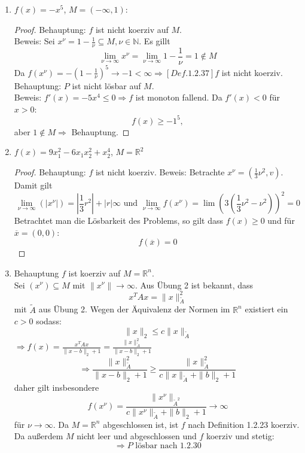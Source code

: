 \documentclass[12pt]{extreport} %
\newcommand{\N}{\mathbb{N}}
\newcommand{\R}{\mathbb{R}}
\theoremstyle{named}
\theoremstyle{nnamed}
\theoremstyle{itshape}
\theoremstyle{normal}
\begin{document}
	\begin{enumerate}
		\item $f(x) = - x^5$, $M =(- \infty, 1)$: ~\medskip
			\begin{proof}
				Behauptung: $f$ ist nicht koerziv auf $M$. ~\\
				Beweis: Sei $x^\nu = 1 - \frac{1}{\nu} \subseteq M, \nu \in \N$. Es gillt
				$$ \lim_{\nu \rightarrow \infty} x^\nu = \lim_{\nu \rightarrow \infty} 1 - \frac{1}{\nu} = 1 \notin M $$
				Da $f(x^\nu) = - \left( 1 - \frac{1}{\nu} \right)^5 \rightarrow -1 < \infty \Rightarrow[Def. 1.2.37]{} f$ ist nicht koerziv. ~\\
				
				Behauptung: $P$ ist nicht lösbar auf $M$. ~\\
				Beweis: $f'(x) = - 5 x^4 \leq 0 \Rightarrow f$ ist monoton fallend. Da $f'(x) < 0$ für $x > 0$:
				$$ f(x) \geq -1^5, $$
				aber $1 \notin M \Rightarrow$ Behauptung.
			\end{proof}
		\item $f(x) = 9 x_1^2 - 6x_1 x_2^2 + x_2^4$, $M = \R^2$
			\begin{proof}
				Behauptung: $f$ ist nicht koerziv.
				Beweis: Betrachte $x^\nu = \left( \frac{1}{3} \nu^2, v \right)$. Damit gilt
				$$ \lim_{\nu \rightarrow \infty} \left( |x^\nu| \right) = \left| \frac{1}{3} r^2 \right| + \left| r \right| \infty \text{ und } \lim_{\nu \rightarrow \infty} f(x^\nu) = \lim \left( 3 \left( \frac{1}{3} \nu^2 - \nu^2 \right) \right)^2 = 0 $$
				Betrachtet man die Lösbarkeit des Problems, so gilt dass $f(x) \geq 0$ und für $\overline{x} = (0, 0)$:
				$$ f(\overline{x}) = 0 $$
			\end{proof}
		\item Behauptung $f$ ist koerziv auf $M = \R^n$. ~\\
			Sei $(x^\nu) \subseteq M$ mit $\| x^\nu \| \rightarrow \infty$. Aus Übung 2 ist bekannt, dass 
			$$ x^T A x = \| x \|_{\tilde{A}}^2 $$
			mit $\tilde{A}$ aus Übung 2. Wegen der Äquivalenz der Normen im $\R^n$ existiert ein $c > 0$ sodass:
			$$ \| x \|_2 \leq c \| x \|_{\tilde{A}} $$
			$\Rightarrow f(x) = \frac{x^T A x }{\| x - b \|_2 + 1} = \frac{\| x \|_{\tilde{A}}^2}{\| x - b \|_2 + 1}$
			$$ \Rightarrow \frac{\| x \|_{\tilde{A}}^2}{\| x - b \|_2 + 1} \geq \frac{\| x \|_{\tilde{A}}^2}{c \| x\|_{\tilde{A}} + \| b \|_2 + 1} $$
			daher gilt insbesondere 
			$$ f(x^\nu) = \frac{\| x^\nu \|_{\tilde{A}^2}}{c \| x^\nu \|_{\tilde{A}} + \| b \|_2 + 1} \rightarrow \infty $$
			für $\nu \rightarrow \infty$. Da $M = \R^n$ abgeschlossen ist, ist $f$ nach Definition 1.2.23 koerziv. Da außerdem $M$ nicht leer und abgeschlossen und $f$ koerziv und stetig:
			$$ \Rightarrow P \text{ lösbar nach 1.2.30} $$
	\end{enumerate}
	
\end{document}
